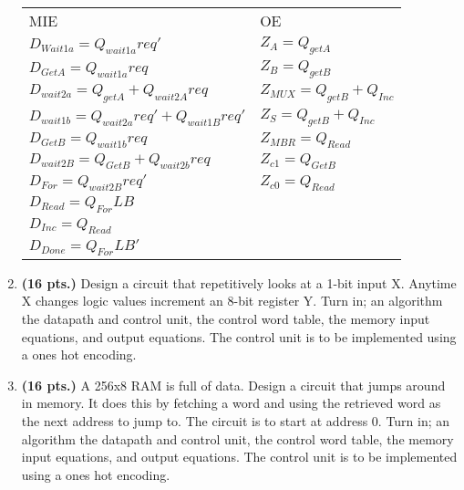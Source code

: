 \begin{enumerate}
\begin{onlysolution}
{                \begin{tabular}{ll}
                    MIE                    &    OE            \\
                    $D_{Wait1a}= Q_{wait1a}req'$        &  $Z_{A} = Q_{getA}$        \\
                    $D_{GetA } = Q_{wait1a}req$        &  $Z_{B} = Q_{getB}$        \\
                    $D_{wait2a}= Q_{getA} + Q_{wait2A}req$    &  $Z_{MUX} = Q_{getB} + Q_{Inc}$        \\
                    $D_{wait1b}= Q_{wait2a}req' + Q_{wait1B}req'$    &  $Z_{S} = Q_{getB} + Q_{Inc}$        \\
                    $D_{GetB } = Q_{wait1b}req$        &  $Z_{MBR} = Q_{Read}$        \\
                    $D_{wait2B}= Q_{GetB} + Q_{wait2b}req$    &  $Z_{c1} = Q_{GetB}$        \\
                    $D_{For  } = Q_{wait2B}req'$        &  $Z_{c0} = Q_{Read}$        \\
                    $D_{Read } = Q_{For}LB$            &          \\
                    $D_{Inc  } = Q_{Read}$            &         \\
                    $D_{Done } = Q_{For}LB'$        &          \\
                \end{tabular}

            }
        \end{onlysolution}

    \item  \textbf{ (16 pts.)}
        Design a circuit that repetitively looks at a 1-bit input X.
        Anytime X changes logic values increment an 8-bit
        register Y.
        Turn in; an algorithm the datapath and control unit, the control word
        table, the memory input equations, and output equations.
        The control unit is to be implemented using a ones hot encoding.

    \item \textbf{ (16 pts.)}
        A 256x8 RAM is full of data.  Design a circuit that jumps
        around in memory.  It does this by fetching a word and using the
        retrieved word as the next address to jump to.  The circuit is to
        start at address 0.
        Turn in; an algorithm the datapath and control unit, the control word
        table, the memory input equations, and output equations.
        The control unit is to be implemented using a ones hot encoding.


\end{enumerate}
